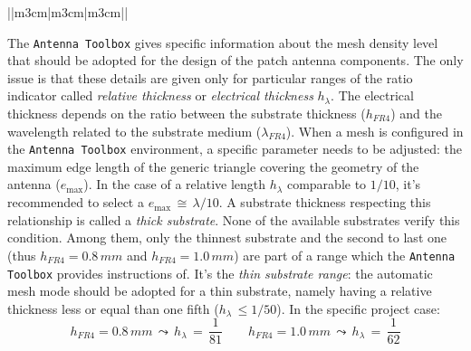 \documentclass[12pt,a4paper]{article}
\begin{document}
{\begin{table}[h]
\begin{center}
{\begin{tabular}{||m{3cm}|m{3cm}|m{3cm}||}
	\end{tabular}}\end{center}\end{table}
	\FloatBarrier
	The \texttt{\color{Mahogany}Antenna Toolbox} gives specific
	information about the mesh density level that should be adopted for the design of the patch antenna components. The only issue is that these details are given only for particular ranges of the ratio indicator called \emph{relative thickness} or \emph{electrical thickness} $h_{\lambda}$. The electrical thickness depends on the ratio between the substrate thickness ($h_{FR4}$) and the wavelength related to the substrate medium ($\lambda_{FR4}$). When a mesh is configured in the \texttt{\color{Mahogany}Antenna Toolbox} environment, a specific parameter needs to be adjusted: the maximum edge length of the generic triangle covering the geometry of the antenna ($e_{\max}$). In the case of a relative length $h_\lambda$ comparable to $1/10$, it's recommended to select a $e_{\max}\,\cong\,\lambda/10$. A substrate thickness respecting this relationship is called a \emph{thick substrate}. None of the available substrates verify this condition. Among them, only the thinnest substrate and the second to last one (thus $h_{FR4}=0.8\,mm$ and $h_{FR4}=1.0\,mm$) are part of a range which the \texttt{\color{Mahogany}Antenna Toolbox} provides instructions of. It's the \emph{thin substrate range}: the automatic mesh mode should be adopted for a thin substrate, namely having a relative thickness less or equal than one fifth ($h_\lambda\,\leq{1/50}$). In the specific project case: 
	\begin{equation}
		h_{FR4}=0.8\,mm\,\leadsto\,h_{\lambda}\,=\,\frac{1}{81}\qquad 	h_{FR4}=1.0\,mm\,\leadsto\,h_{\lambda}\,=\,\frac{1}{62}
	\end{equation}
	\begin{center}
	\end{center}
	
}
\end{document}
